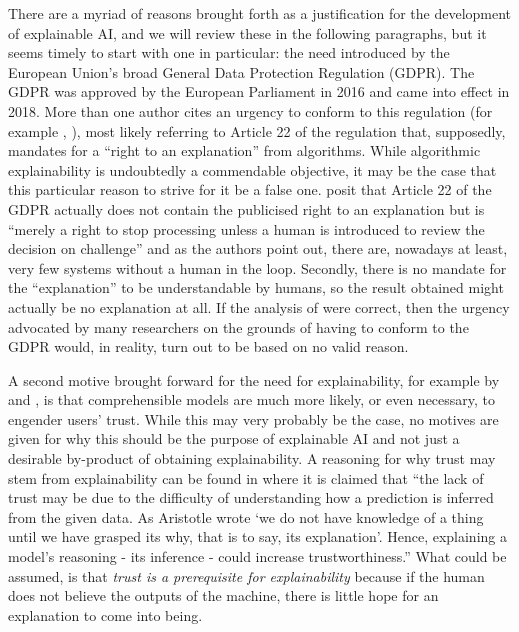 There are a myriad of reasons brought forth as a justification for the development of explainable AI, and we will review these in the following paragraphs, but it seems timely to start with one in particular: the need introduced by the European Union's broad General Data Protection Regulation (GDPR).
The GDPR was approved by the European Parliament in 2016 and came into effect in 2018.
More than one author cites an urgency to conform to this regulation (for example \citet{doshi2017towards}, \citet{gilpin2018explaining}), most likely referring to Article 22 of the regulation that, supposedly, mandates for a \enquote{right to an explanation} from algorithms.
While algorithmic explainability is undoubtedly a commendable objective, it may be the case that this particular reason to strive for it be a false one.
\citet{edwards2018enslaving} posit that Article 22 of the GDPR actually does not contain the publicised right to an explanation but is \enquote{merely a right to stop processing unless a human is introduced to review the decision on challenge} and as the authors point out, there are, nowadays at least, very few systems without a human in the loop.
Secondly, there is no mandate for the \enquote{explanation} to be understandable by humans, so the result obtained might actually be no explanation at all.
If the analysis of \citet{edwards2018enslaving} were correct, then the urgency advocated by many researchers on the grounds of having to conform to the GDPR would, in reality, turn out to be based on no valid reason.

A second motive brought forward for the need for explainability, for example by \citet{gilpin2018explaining} and \citet{abdul2018trends}, is that comprehensible models are much more likely, or even necessary, to engender users' trust.
While this may very probably be the case, no motives are given for why this should be the purpose of explainable AI and not just a desirable by-product of obtaining explainability. 
A reasoning for why trust may stem from explainability can be found in \citep{Kyrimi2016} where it is claimed that \enquote{the lack of trust may be due to the difficulty of understanding how a prediction is inferred from the given data. As Aristotle wrote `we do not have knowledge of a thing until we have grasped its why, that is to say, its explanation'. Hence, explaining a model's reasoning - its inference - could increase trustworthiness.} 
What could be assumed, is that \textit{trust is a prerequisite for explainability} because if the human does not believe the outputs of the machine, there is little hope for an explanation to come into being.

